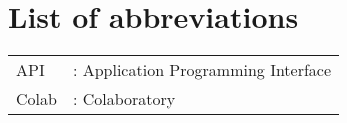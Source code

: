 \newpage
\chapter*{List of abbreviations}
\begin{tabular}{l l}
API	&	:	Application Programming Interface	\\
Colab	&	:	Colaboratory	\\


\end{tabular}









